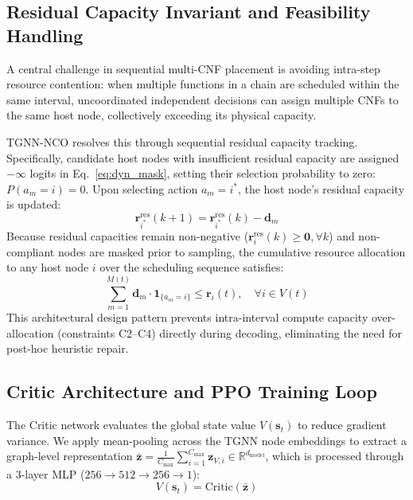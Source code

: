 \documentclass[conference]{IEEEtran}
\begin{document}
\subsection{Residual Capacity Invariant and Feasibility Handling}
A central challenge in sequential multi-CNF placement is avoiding intra-step resource contention: when multiple functions in a chain are scheduled within the same interval, uncoordinated independent decisions can assign multiple CNFs to the same host node, collectively exceeding its physical capacity.

TGNN-NCO resolves this through sequential residual capacity tracking. Specifically, candidate host nodes with insufficient residual capacity are assigned $-\infty$ logits in Eq.~\eqref{eq:dyn_mask}, setting their selection probability to zero: $P(a_m = i) = 0$. Upon selecting action $a_m = i^*$, the host node's residual capacity is updated:
\begin{equation}
\mathbf{r}_{i^*}^{\text{res}}(k+1) = \mathbf{r}_{i^*}^{\text{res}}(k) - \mathbf{d}_m
\end{equation}
Because residual capacities remain non-negative ($\mathbf{r}_i^{\text{res}}(k) \ge \mathbf{0}, \forall k$) and non-compliant nodes are masked prior to sampling, the cumulative resource allocation to any host node $i$ over the scheduling sequence satisfies:
\begin{equation}
\sum_{m=1}^{M(t)} \mathbf{d}_m \cdot \mathbf{1}_{\{a_m = i\}} \le \mathbf{r}_i(t), \quad \forall i \in V(t)
\end{equation}
This architectural design pattern prevents intra-interval compute capacity over-allocation (constraints C2--C4) directly during decoding, eliminating the need for post-hoc heuristic repair.


\subsection{Critic Architecture and PPO Training Loop}
The Critic network evaluates the global state value $V(\mathbf{s}_t)$ to reduce gradient variance. We apply mean-pooling across the TGNN node embeddings to extract a graph-level representation $\bar{\mathbf{z}} = \frac{1}{C_{\max}} \sum_{i=1}^{C_{\max}} \mathbf{z}_{V, i} \in \mathbb{R}^{d_{\text{model}}}$, which is processed through a 3-layer MLP ($256 \to 512 \to 256 \to 1$):
\begin{equation}
V(\mathbf{s}_t) = \text{Critic}(\bar{\mathbf{z}})
\end{equation}
\end{document}
